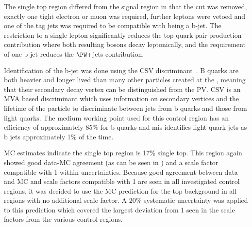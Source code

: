 The single top region differed from the signal region in that the \jetmetdphi cut was removed, exactly one tight electron or muon was required, further leptons were vetoed and one of the tag jets was required to be compatible with being a b-jet. The restriction to a single lepton significantly reduces the top quark pair production contribution where both resulting \PW bosons decay leptonically, and the requirement of one b-jet reduces the $\PW+$jets contribution. 

Identification of the b-jet was done using the \ac{CSV} discriminant~\cite{bjets}. B quarks are both heavier and longer lived than many other particles created at the \LHC, meaning that their secondary decay vertex can be distinguished from the \ac{PV}. \ac{CSV} is an \ac{MVA} based discriminant which uses information on secondary vertices and the lifetime of the particle to discriminate between jets from b quarks and those from light quarks. The medium working point used for this control region has an efficiency of approximately 85\% for b-quarks and mis-identifies light quark jets as b jets approximately 1\% of the time.

\ac{MC} estimates indicate the single top region is 17\% single top. This region again showed good data-\ac{MC} agreement (as can be seen in ) and a scale factor compatible with 1 within uncertainties. Because good agreement between data and \ac{MC} and scale factors compatible with 1 are seen in all investigated control regions, it was decided to use the \ac{MC} prediction for the top background in all regions with no additional scale factor. A 20\% systematic uncertainty was applied to this prediction which covered the largest deviation from 1 seen in the scale factors from the various control regions.

